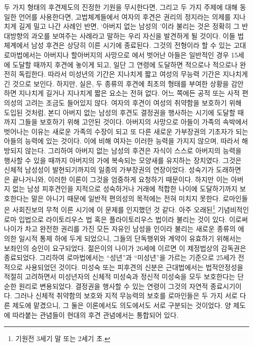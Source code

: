 두 가지 형태의 후견제도의 진정한 기원을 무시한다면,
그리고 두 가지 주제에 대해 동일한 언어를 사용한다면,
고법체계들에서
여자의 후견은
권리의 정지라는 의제를 지나치게 길게 밀고 나간 사례인 반면,
`아버지 없는 남성의 '이라 불리는 것은
정확히 그 반대방향의 과오를 보여주는 사례라고 말하는
우리 자신을 발견하게 될 것이다.
이들 법체계에서 남성 후견은 상당히 이른 시기에 종료된다.
그것의 전형이라 할 수 있는 고대 로마법에서는
아버지나 할아버지의 사망으로 에서 벗어난 아들은
일반적인 경우 15세에 도달할 때까지 후견에 놓이게 되고, 일단
그 연령에 도달하면 적으로나 적으로나 완전히 독립한다.
따라서 미성년의 기간은 지나치게 짧고
여성의 무능력 기간은 지나치게 긴 것으로 보인다.
하지만, 실은,
두 종류의 후견에 최초의 형태를 부여한 상황을 감안하면
지나치게 길거나 지나치게 짧은 요소는 전혀 없다.
어느 쪽에든 공적 또는 사적 편의성의 고려는 조금도 들어있지 않다.
여자의 후견이 여성의 취약함을 보호하기 위해 도입된 것처럼,
본디 아버지 없는 남성의 후견도
결정권을 행사하는 시기에 도달할 때까지 그들을 보호하기 위해 고안된 것이다.
아버지의 사망으로 아들이 가족의 속박에서 벗어나는 이유는
새로운 가족의 수장이 되고 또 다른 새로운 가부장권의 기초자가 되는
아들의 능력에 있는 것이다.
이에 비해 여자는 이러한 능력을 가지지 않으며, 따라서
 해방되지 않는다.
그리하여 아버지 없는 남성의 후견은
자식이 스스로 아버지의 능력을 행사할 수 있을 때까지
아버지의 가에 복속되는 모양새를 유지하는
장치였다.
그것은 신체적 남성성이 발현되기까지의 일종의 가부장권의 연장이었다.
성숙기가 도래하면 은 끝나거니와,
이러한 이론이 그것을 엄중하게 요청하기 때문이다.
하지만 이는 아버지 없는 남성 피후견인을
지적으로 성숙하거나 거래에 적합한 나이에
도달하기까지 보호한다는 말은 아니기 때문에
일반적 편의성의 목적에는 전혀 미치지 못한다.
로마인들은 사회진보의 무척 이른 시기에 이 문제를 인지했던 것 같다.
아주 오래된\footnote{기원전 3세기 말 또는 2세기 초.}
기념비적인 로마 입법으로 라이토리우스 법
혹은 플라이토리우스 법이라 불리는 것이 있다.
이로써 나이가 차고 완전한 권리를 가진 모든 자유인 남성을
인이라 불리는
새로운 종류의 에 의한
일시적 통제 하에 두게 되었으니,
그들의 단독행위와 계약이 유효하기 위해서는 보좌인의 승인이 요구되었다.
젊은이의 나이가 26세에 이르면 이 제정법상의 감독권은 종료되었다.
그리하여 로마법에서는 ``성년''과 ``미성년''을 가르는 기준으로
25세가 전적으로 사용되었던 것이다.
미성숙 또는 피후견의 신분은
근대법에서는
법적안정성을 적절히 고려하면서
미성년자의 신체적 미성숙과 정신적 미성숙을 모두 보호한다는
단순한 원리로 변용되었다.
결정권을 행사할 수 있는 연령이 그것의 자연적 종료시기이다.
그러나 신체적 취약함의 보호와 지적 무능력의 보호를
로마인들은 두 가지 서로 다른 제도에 맡겼으니, 그 둘은
이론에서도 의도에서도 서로 구분되는 것이었다.
양 제도에 따라붙는 관념들이 현대의 후견 관념에서는 통합되어 있다.

